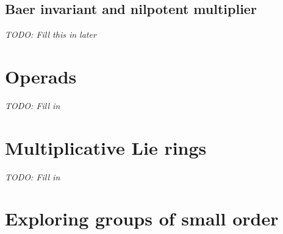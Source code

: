 \documentclass{ucetd}
\begin{document}
\subsection{Baer invariant and nilpotent multiplier}

{\em TODO: Fill this in later}

\section{Operads}\label{appsec:operads}

{\em TODO: Fill in}

\section{Multiplicative Lie rings}\label{appsec:multiplicative-lie-rings}

{\em TODO: Fill in}
 
\section{Exploring groups of small order}
\end{document}
